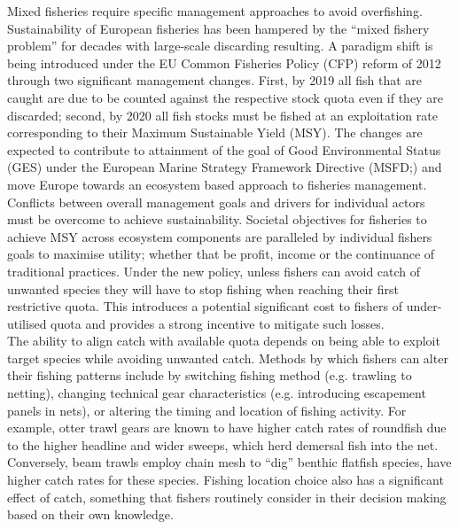 \documentclass[fleqn,10pt]{wlscirep}
\begin{document}
\begin{linenumbers}
Mixed fisheries require specific management approaches to avoid overfishing.
Sustainability of European fisheries has been hampered by the ``mixed fishery
problem'' for decades with large-scale discarding resulting\cite{Borges2015,
	Uhlmann2014}. A paradigm shift is being introduced under the EU Common
Fisheries Policy (CFP) reform of 2012 through two significant management
changes.  First, by 2019 all fish that are caught are due to be counted against
the respective stock quota even if they are discarded; second, by 2020 all fish
stocks must be fished at an exploitation rate corresponding to their Maximum
Sustainable Yield
(MSY)\cite{EuropeanParliamentandCounciloftheEuropeanUnion2013}. The changes are
expected to contribute to attainment of the goal of Good Environmental Status
(GES) under the European Marine Strategy Framework Directive
(MSFD;\cite{EuropeanParliament2008}) and move Europe towards an ecosystem based
approach to fisheries management\cite{Garcia2003}. \\

Conflicts between overall management goals and drivers for individual actors
must be overcome to achieve sustainability. Societal objectives for fisheries
to achieve MSY across ecosystem components are paralleled by individual fishers
goals to maximise utility; whether that be profit, income or the continuance of
traditional practices\cite{Holland2008}. Under the new policy, unless fishers
can avoid catch of unwanted species they will have to stop fishing when
reaching their first restrictive quota. This introduces a potential significant
cost to fishers of under-utilised quota\cite{Hoff2010a, Ulrich2016} and
provides a strong incentive to mitigate such losses\cite{Condie2013,
	Condie2013a}. \\

The ability to align catch with available quota depends on being able to
exploit target species while avoiding unwanted catch. Methods by which fishers
can alter their fishing patterns include by switching fishing method (e.g.
trawling to netting), changing technical gear characteristics (e.g.
introducing escapement panels in nets), or altering the timing and location of
fishing activity\cite{Fulton2011b, vanPutten2012a}. For example, otter trawl
gears are known to have higher catch rates of roundfish due to the higher
headline and wider sweeps, which herd demersal fish into the net. Conversely,
beam trawls employ chain mesh to ``dig'' benthic flatfish species, have higher
catch rates for these species\cite{Fraser2008}. Fishing location choice also
has a significant effect of catch\cite{Gerritsen2012}, something that fishers
routinely consider in their decision making based on their own knowledge. \\


\end{linenumbers}
\end{document}
